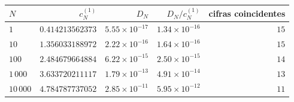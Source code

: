 \begin{tabular}{lrrrr}
\toprule
$N$ & $c_N^{(1)}$ & $D_N$ & $D_N/c_N^{(1)}$ & cifras coincidentes \\
\midrule
$1$ & $0.414213562373$ & $5.55 \times 10^{-17}$ & $1.34 \times 10^{-16}$ & $15$ \\
$10$ & $1.356033188972$ & $2.22 \times 10^{-16}$ & $1.64 \times 10^{-16}$ & $15$ \\
$100$ & $2.484679664884$ & $6.22 \times 10^{-15}$ & $2.50 \times 10^{-15}$ & $14$ \\
$1\,000$ & $3.633720211117$ & $1.79 \times 10^{-13}$ & $4.91 \times 10^{-14}$ & $13$ \\
$10\,000$ & $4.784787737052$ & $2.85 \times 10^{-11}$ & $5.95 \times 10^{-12}$ & $11$ \\
\bottomrule
\end{tabular}
